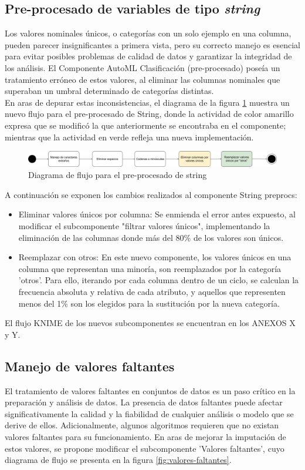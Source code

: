 \subsection{Pre-procesado de variables de tipo \textit{string}}
Los valores nominales únicos, o categorías con un solo ejemplo en una columna, pueden parecer insignificantes a primera vista, pero su correcto manejo es esencial para evitar posibles problemas de calidad de datos y garantizar la integridad de los análisis. El Componente AutoML Clasificación (pre-procesado) poseía un tratamiento erróneo de estos valores, al eliminar las columnas nominales que superaban un umbral determinado de categorías distintas. \\ 
En aras de depurar estas inconsistencias, el diagrama de la figura \ref{fig:string-preprocs} muestra un nuevo flujo para el pre-procesado de String, donde la actividad de color amarillo expresa que se modificó la que anteriormente se encontraba en el componente; mientras que la actividad en verde refleja una nueva implementación.

\begin{figure}[H]
	\centering
	\includegraphics[width=0.95\linewidth]{"figuras/capi 2/preprocesado/string preprocs.drawio"}
	\caption{Diagrama de flujo para el pre-procesado de string}
	\label{fig:string-preprocs}
\end{figure}

A continuación se exponen los cambios realizados al componente String preprocs:
\begin{itemize}
	\item Eliminar valores únicos por columna:  Se enmienda el error antes expuesto, al modificar el subcomponente "filtrar valores únicos", implementando la eliminación de las columnas donde más del 80\% de los valores son únicos.
	\item Reemplazar con otros: En este nuevo componente, los valores únicos en una columna que representan una minoría, son reemplazados por la categoría 'otros'.  Para ello, iterando por cada columna dentro de un ciclo, se calculan la frecuencia absoluta y relativa de cada atributo, y aquellos que representen menos del 1\% son los elegidos para la sustitución por la nueva categoría. 
\end{itemize}
El flujo KNIME de los nuevos subcomponentes se encuentran en los ANEXOS X y Y.


\subsection{Manejo de valores faltantes}
El tratamiento de valores faltantes en conjuntos de datos es un paso crítico en la preparación y análisis de datos. La presencia de datos faltantes puede afectar significativamente la calidad y la fiabilidad de cualquier análisis o modelo que se derive de ellos. Adicionalmente, algunos algoritmos requieren que no existan valores faltantes para su funcionamiento. En aras de mejorar la imputación de estos valores, se propone modificar el subcomponente 'Valores faltantes', cuyo diagrama de flujo se presenta en la figura \ref{fig:valores-faltantes}.

